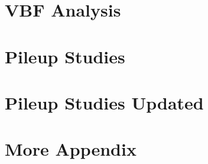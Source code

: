 \documentclass[12pt]{report}
\begin{document}
\chapter{VBF Analysis}


\appendix
\chapter{Pileup Studies}


\chapter{Pileup Studies Updated}


\chapter{More Appendix}

\end{document}
